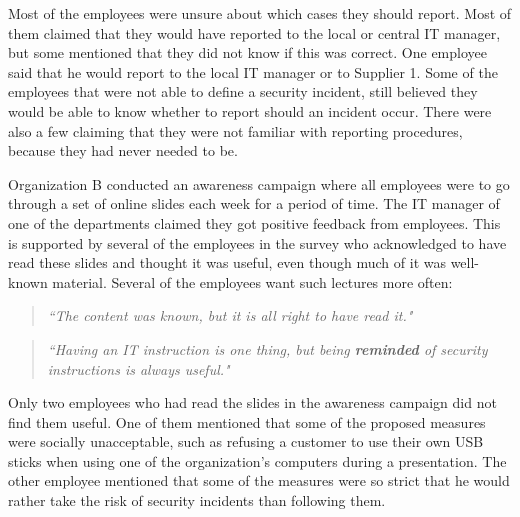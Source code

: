 Most of the employees were unsure about which cases they should report. Most of them claimed that they would have reported to the local or central IT manager, but some mentioned that they did not know if this was correct. One employee said that he would report to the local IT manager or to Supplier 1. Some of the employees that were not able to define a security incident, still believed they would be able to know whether to report should an incident occur. There were also a few claiming that they were not familiar with reporting procedures, because they had never needed to be.

Organization B conducted an awareness campaign where all employees were to go through a set of online slides each week for a period of time. The IT manager of one of the departments claimed they got positive feedback from employees. This is supported by several of the employees in the survey who acknowledged to have read these slides and thought it was useful, even though much of it was well-known material. Several of the employees want such lectures more often:

\begin{quote}
\textit{``The content was known, but it is all right to have read it."}
\end{quote} 

\begin{quote}
\textit{``Having an IT instruction is one thing, but being \textbf{reminded} of security instructions is always useful."}
\end{quote}

Only two employees who had read the slides in the awareness campaign did not find them useful. One of them mentioned that some of the proposed measures were socially unacceptable, such as refusing a customer to use their own USB sticks when using one of the organization's computers during a presentation. The other employee mentioned that some of the measures were so strict that he would rather take the risk of security incidents than following them.